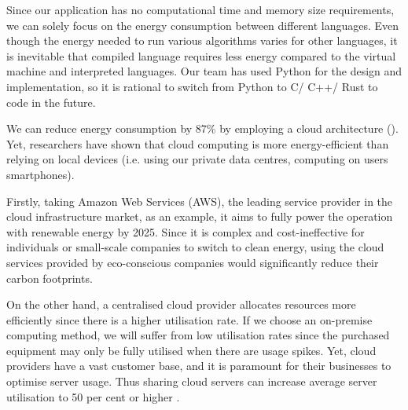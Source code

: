 Since our application has no computational time and memory size requirements, we can solely focus on the energy consumption between 
different languages. Even though the energy needed to run various algorithms varies for other languages, it is inevitable that
compiled language requires less energy compared to the virtual machine and interpreted languages. Our team has used Python for the design and implementation, so 
it is rational to switch from Python to C/ C++/ Rust to code in the future.

We can reduce energy consumption by 87\% by employing a cloud architecture (\cite{cloudpercent}).
Yet, researchers have shown that cloud computing is more energy-efficient than relying on local devices (i.e. using our private data centres, computing on
users\textsc{} smartphones).

Firstly, taking Amazon Web Services (AWS), the leading service provider in the cloud infrastructure market, as an example, it aims to fully power the operation with renewable
energy by 2025. Since it is complex and cost-ineffective for individuals or small-scale companies to switch to clean energy, using the cloud services provided
by eco-conscious companies would significantly reduce their carbon footprints.

On the other hand, a centralised cloud provider allocates resources more efficiently since there is a higher utilisation rate. If we choose an on-premise computing method, we will suffer
from low utilisation rates since the purchased equipment may only be fully utilised when there are usage spikes. Yet, cloud providers have a vast customer base, and it is paramount for 
their businesses to optimise server usage. Thus sharing cloud servers can increase average server utilisation to 50 per cent or higher .

